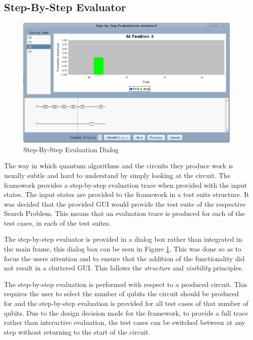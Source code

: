 \subsection{Step-By-Step Evaluator}
\label{sec:sbse}

\begin{figure}
 \includegraphics[width=\textwidth]{StepByStepEval.jpg}
\caption{Step-By-Step Evaluation Dialog}
\label{fig:StepByStepEval}
\end{figure}
The way in which quantum algorithms and the circuits they produce work is usually subtle and hard to understand by simply looking at the circuit.
The framework provides a step-by-step evaluation trace when provided with the input states.
The input states are provided to the framework in a test suite structure.
It was decided that the provided GUI would provide the test suite of the respective Search Problem.
This means that an evaluation trace is produced for each of the test cases, in each of the test suites.

The step-by-step evaluator is provided in a dialog box rather than integrated in the main frame, this dialog box can be seen in Figure \ref{fig:StepByStepEval}.
This was done so as to focus the users attention and to ensure that the addition of the functionality did not result in a cluttered GUI.
This follows the \emph{structure} and \emph{visibility} principles.

The step-by-step evaluation is performed with respect to a produced circuit.
This requires the user to select the number of qubits the circuit should be produced for and the step-by-step evaluation is provided for all test cases of that number of qubits.
Due to the design decision made for the framework, to provide a full trace rather than interactive evaluation, the test cases can be switched between at any step without returning to the start of the circuit.

